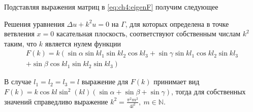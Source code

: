 Подставляя выражения матриц в \eqref{eq:ch4:eigenF} получим следующее
\begin{statement}
Решения уравнения $\Delta u + k^2 u =0 $ на  $\Gamma$, для которых определена в точке ветвления $x=0$ касательная плоскость, соответствуют собственным числам $k^2$ таким, что $k$ является нулем функции
\begin{multline*}
F(k)=k \left(
\sin{\alpha} \sin{k l_1} \sin{k l_2} \cos{k l_3} + 
\sin{\gamma} \sin{k l_1} \cos{k l_2} \sin{k l_3} 
\right. \\ \left. + 
\sin{\beta} \cos{k l_1} \sin{k l_2} \sin{k l_3} 
 \right)
 \end{multline*}
 
 В случае $l_1=l_2=l_3=l$ выражение для $F(k)$ принимает вид $F(k) = k \cos{k l} \sin^2 (k l) \left( \sin \alpha + \sin \beta + \sin \gamma \right)$, тогда для собственных значений справедливо выражение $ k^2 = \frac{ \pi^2 m^2}{4l^2},   \ m \in \mathbb{N}$.
\label{stat:1dimAnglesSpectrum}
\end{statement}

\clearpage
